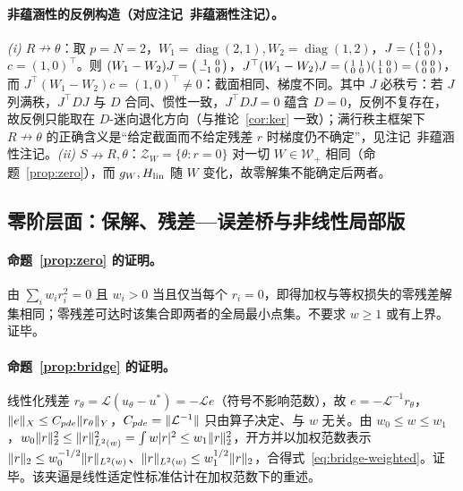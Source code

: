 \documentclass[fontset=windows,11pt]{ctexart}
\DeclarePairedDelimiter{\norm}{\lVert}{\rVert}
\newcommand{\W}{W}
\newcommand{\Lop}{\mathcal L}
\DeclareMathOperator{\diag}{diag}
\numberwithin{equation}{section}
\begin{document}
\paragraph{非蕴涵性的反例构造（对应注记~非蕴涵性注记）。}
\emph{(i) $R\nrightarrow\theta$}：取 $p=N=2$，$\W_1=\diag(2,1),\W_2=\diag(1,2)$，$J=\begin{psmallmatrix}1&0\\1&0\end{psmallmatrix}$，$c=(1,0)^\top$。则 $(\W_1-\W_2)J=\begin{psmallmatrix}1&0\\-1&0\end{psmallmatrix}$，$J^\top(\W_1-\W_2)J=\begin{psmallmatrix}1&1\\0&0\end{psmallmatrix}\begin{psmallmatrix}1&0\\1&0\end{psmallmatrix}=\begin{psmallmatrix}0&0\\0&0\end{psmallmatrix}$，而 $J^\top(\W_1-\W_2)c=(1,0)^\top\neq0$：截面相同、梯度不同。其中 $J$ 必秩亏：若 $J$ 列满秩，$J^\top D J$ 与 $D$ 合同、惯性一致，$J^\top D J=0$ 蕴含 $D=0$，反例不复存在，故反例只能取在 $D$-迷向退化方向（与推论~\ref{cor:ker} 一致）；满行秩主框架下 $R\nrightarrow\theta$ 的正确含义是“给定截面而不给定残差 $r$ 时梯度仍不确定”，见注记~非蕴涵性注记。\emph{(ii) $S\nrightarrow R,\theta$}：$\mathcal Z_{\W}=\{\theta:r=0\}$ 对一切 $\W\in\mathcal W_+$ 相同（命题~\ref{prop:zero}），而 $g_{\W},H_{\rm lin}$ 随 $\W$ 变化，故零解集不能确定后两者。

\subsection{零阶层面：保解、残差—误差桥与非线性局部版}
\paragraph{命题~\ref{prop:zero} 的证明。}
由 $\sum_i w_i r_i^2=0$ 且 $w_i>0$ 当且仅当每个 $r_i=0$，即得加权与等权损失的零残差解集相同；零残差可达时该集合即两者的全局最小点集。不要求 $w\ge1$ 或有上界。证毕。

\paragraph{命题~\ref{prop:bridge} 的证明。}
线性化残差 $r_\theta=\Lop(u_\theta-u^*)=-\Lop e$（符号不影响范数），故 $e=-\Lop^{-1}r_\theta$，$\norm e_X\le C_{pde}\norm{r_\theta}_Y$，$C_{pde}=\norm{\Lop^{-1}}$ 只由算子决定、与 $w$ 无关。由 $w_0\le w\le w_1$，$w_0\norm r_2^2\le\norm r_{L^2(w)}^2=\int w|r|^2\le w_1\norm r_2^2$，开方并以加权范数表示 $\norm r_2\le w_0^{-1/2}\norm r_{L^2(w)}$、$\norm r_{L^2(w)}\le w_1^{1/2}\norm r_2$，合得式~\eqref{eq:bridge-weighted}。证毕。该夹逼是线性适定性标准估计在加权范数下的重述\cite{vanDerMeer2020,MishraMolinaro2020}。
\end{document}

